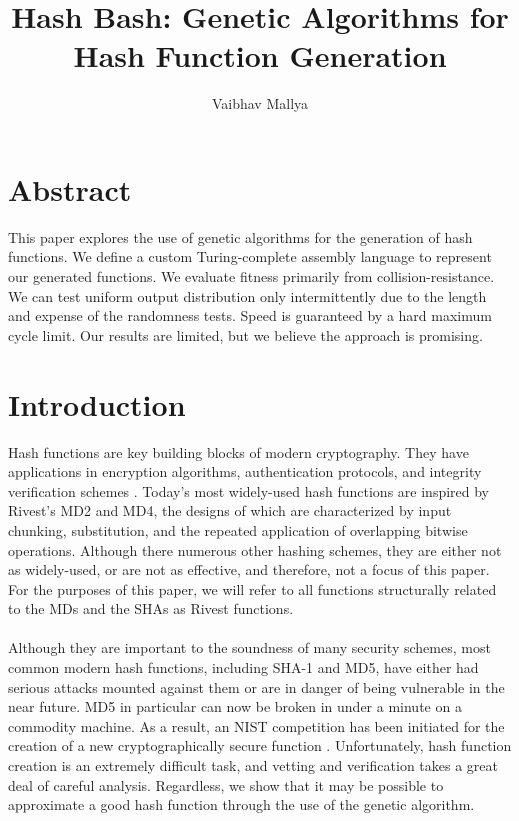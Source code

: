 \documentclass{article}
\begin{document}
\title{Hash Bash: Genetic Algorithms for Hash Function Generation}
\author{Vaibhav Mallya}
\maketitle
\section{Abstract}


This paper explores the use of genetic algorithms for the generation of hash functions. We define a custom Turing-complete assembly language to represent our generated functions. We evaluate fitness primarily from collision-resistance. We can test uniform output distribution only intermittently due to the length and expense of the randomness tests. Speed is guaranteed by a hard maximum cycle limit. Our results are limited, but we believe the approach is promising.

\section{Introduction}
Hash functions are key building blocks of modern cryptography. They have applications in encryption algorithms, authentication protocols, and integrity verification schemes \cite{Cohen}. Today's most widely-used hash functions are inspired by Rivest's MD2 \cite{RivestMD2} and MD4, the designs of which are characterized by input chunking, substitution, and the repeated application of overlapping bitwise operations. Although there numerous other hashing schemes, they are either not as widely-used, or are not as effective, and therefore, not a focus of this paper. For the purposes of this paper, we will refer to all functions structurally related to the MDs and the SHAs as Rivest functions.

\paragraph{}
Although they are important to the soundness of many security schemes, most common modern hash functions, including SHA-1 and MD5, have either had serious attacks mounted against them or are in danger of being vulnerable in the near future.
MD5 in particular can now be broken in under a minute on a commodity machine. \cite{cryptoeprint:2005:067} As a result, an NIST competition has been initiated for the creation of a new cryptographically secure function \cite{NISTComp}. Unfortunately, hash function creation is an extremely difficult task, and vetting and verification takes a great deal of careful analysis.
Regardless, we show that it may be possible to approximate a good hash function through the use of the genetic algorithm.
\end{document}

